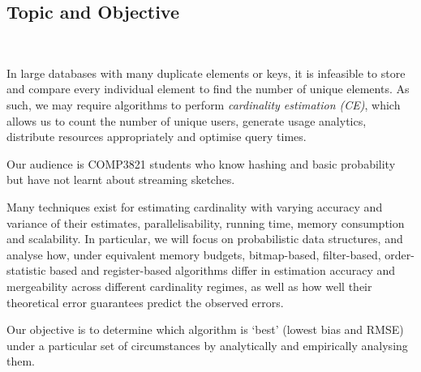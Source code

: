 \subsection{Topic and Objective}
 \\

In large databases with many duplicate elements or keys, it is infeasible to store and compare every individual element to find the number of unique elements. As such, we may require algorithms to perform \textsl{cardinality estimation (CE)}, which allows us to count the number of unique users, generate usage analytics, distribute resources appropriately and optimise query times. 

Our audience is COMP3821 students who know hashing and basic probability but have not learnt about streaming sketches.

Many techniques exist for estimating cardinality with varying accuracy and variance of their estimates, parallelisability, running time, memory consumption and scalability.
In particular, we will focus on probabilistic data structures, and analyse how, under equivalent memory budgets, bitmap-based, filter-based, order-statistic based and register-based algorithms differ in estimation accuracy and mergeability across different cardinality regimes, as well as how well their theoretical error guarantees predict the observed errors. 

Our objective is to determine which algorithm is `best' (lowest bias and RMSE) under a particular set of circumstances by analytically and empirically analysing them. 

